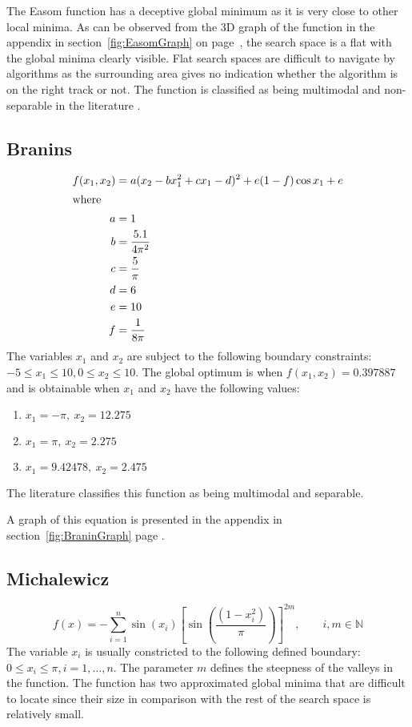 The Easom function has a deceptive global minimum as it is very close to other local minima\cite{ABCCompareStudy,TSGlobalOptimization}. As can be observed from the 3D graph of the function in the appendix in section~\ref{fig:EasomGraph} on page~\pageref{fig:EasomGraph}, the search space is a flat with the global minima clearly visible. Flat search spaces are difficult to navigate by algorithms as the surrounding area gives no indication whether the algorithm is on the right track or not. The function is classified as being multimodal and non-separable in the literature \cite{ABCCompareStudy,TSGlobalOptimization,TSGlobalOptContinFunc}.

\subsection{Branins}
\begin{align}
	f(x_1,x_2) &= a(x_2 - bx_1^2 + cx_1 - d)^2 + e(1-f)\cos{x_1} + e \\
\intertext{where}
	a &= 1\nonumber\\
	b &= \frac{5.1}{4\pi^2}\nonumber\\
	c &= \frac{5}{\pi}\nonumber\\
	d &= 6\nonumber\\
	e &= 10\nonumber\\
	f &= \frac{1}{8\pi}\nonumber
\end{align}
The variables $x_1$ and $x_2$ are subject to the following boundary constraints: $-5\leq x_1 \leq 10, 0 \leq x_2 \leq 10$\cite{ABCCompareStudy,TSGlobalOptimization,ContinACSTS,TestFunctions}. The global optimum is when $f(x_1,x_2) = 0.397887$ and is obtainable when $x_1$ and $x_2$ have the following values\cite{ABCCompareStudy,TSGlobalOptimization,ContinACSTS,TestFunctions}:
\begin{enumerate}
\item $x_1 = -\pi,\:x_2=12.275$
\item $x_1 = \pi,\:x_2=2.275$
\item $x_1 = 9.42478,\:x_2=2.475$
\end{enumerate}
The literature classifies this function as being multimodal and separable\cite{ABCCompareStudy,TSGlobalOptimization,ContinACSTS,TestFunctions}.

A graph of this equation is presented in the appendix in section~\ref{fig:BraninGraph} page \pageref{fig:BraninGraph}.
\subsection{Michalewicz}
\begin{equation}
	f(x) = -\sum_{i=1}^n\sin{(x_i)}[\sin{(\frac{(1 - x_i^2)}{\pi})}]^{2m}, \qquad i,m \in \mathbb{N}
\end{equation}
The variable $x_i$ is usually constricted to the following defined boundary: $0 \leq x_i \leq \pi, i = 1,\ldots,n$\cite{ABCCompareStudy,TestFunctions}. The parameter $m$ defines the steepness of the valleys in the function. The function has two approximated global minima that are difficult to locate since their size in comparison with the rest of the search space is relatively small\cite{ABCCompareStudy,TestFunctions}.

